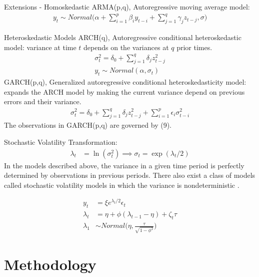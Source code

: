 \documentclass[11pt]{beamer}
\begin{document}
\begin{frame}{Extensions - Homoskedastic}
ARMA(p,q), Autoregressive moving average model:
\begin{align}
y_t \sim Normal \big(\alpha + \sum_{i=1}^p \beta_i y_{t-i} + \sum_{j=1}^q \gamma_j z_{t-j}, \sigma \big)
\end{align}

\end{frame}

\begin{frame}{Heteroskedastic Models}
ARCH(q), Autoregressive conditional heteroskedastic model: variance at time $t$ depends on the variances at $q$ prior times.
\begin{align}
\sigma^2_t = \delta_0 + \sum_{j=1}^q \delta_j z_{t-j}^2 \\
y_t \sim Normal(\alpha, \sigma_t) 
\end{align}
GARCH(p,q), Generalized autoregressive conditional heteroskedasticity model: expands the ARCH model by making the current variance depend on previous errors and their variance.
\begin{align}
\sigma^2_t = \delta_0 + \sum_{j=1}^q \delta_j z_{t-j}^2  + \sum_{i=1}^p \epsilon_i \sigma^2_{t-i}
\end{align}
The observations in GARCH(p,q) are governed by (9).

\end{frame}

\begin{frame}{Stochastic Volatility}
Transformation:
\begin{align}
\lambda_t & = \ln(\sigma^2_t)
\implies \sigma_t = \exp(\lambda_t/2) 
\end{align}
In the models described above, the variance in a given time period is perfectly determined by observations in previous periods. There also exist a class of models called stochastic volatility models in which the variance is nondeterministic .

\begin{align}
y_t &= \xi e^{\lambda_t/2} \epsilon_t \\
\lambda_t &= \eta + \phi(\lambda_{t-1} - \eta) + \zeta_t \tau \\
\lambda_1 &\sim Normal \big( \eta, \frac{\tau}{\sqrt{1 - \phi^2}} \big)
\end{align}
\end{frame}

\section{Methodology}
\end{document}

